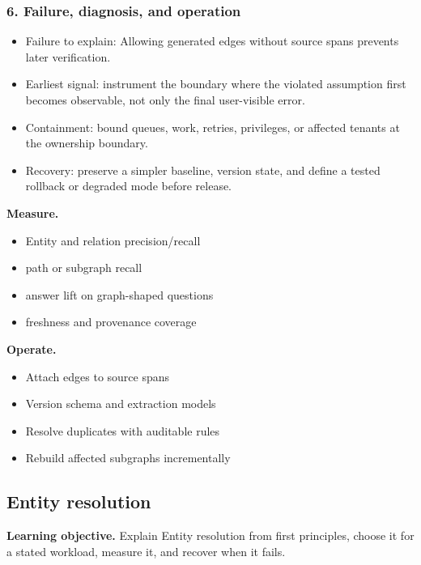 \subsubsection*{6. Failure, diagnosis, and operation}
\begin{itemize}
\item Failure to explain: Allowing generated edges without source spans prevents later verification.
\item Earliest signal: instrument the boundary where the violated assumption first becomes observable, not only the final user-visible error.
\item Containment: bound queues, work, retries, privileges, or affected tenants at the ownership boundary.
\item Recovery: preserve a simpler baseline, version state, and define a tested rollback or degraded mode before release.
\end{itemize}
\textbf{Measure.}\begin{itemize}
\item Entity and relation precision/recall
\item path or subgraph recall
\item answer lift on graph-shaped questions
\item freshness and provenance coverage
\end{itemize}
\textbf{Operate.}\begin{itemize}
\item Attach edges to source spans
\item Version schema and extraction models
\item Resolve duplicates with auditable rules
\item Rebuild affected subgraphs incrementally
\end{itemize}
\subsection{Entity resolution}
\textbf{Learning objective.} Explain Entity resolution from first principles, choose it for a stated workload, measure it, and recover when it fails.
